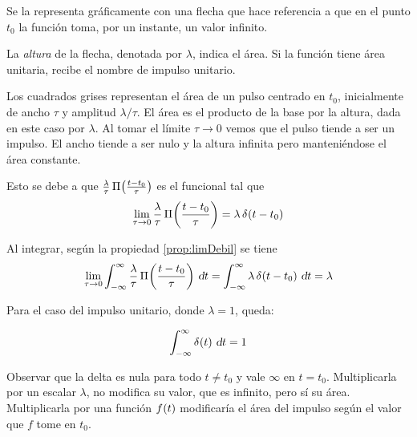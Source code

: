 Se la representa gráficamente con una flecha que hace referencia a que en el punto $t_0$ la función toma, por un instante, un valor infinito.

\begin{center}
    \def\svgwidth{0.6\linewidth}
    
\end{center}

La \emph{altura} de la flecha, denotada por $\lambda$, indica el área.
Si la función tiene área unitaria, recibe el nombre de impulso unitario.

Los cuadrados grises representan el área de un pulso centrado en $t_0$, inicialmente de ancho $\tau$ y amplitud $\lambda / \tau$.
El área es el producto de la base por la altura, dada en este caso por $\lambda$.
Al tomar el límite $\tau \to 0$ vemos que el pulso tiende a ser un impulso.
El ancho tiende a ser nulo y la altura infinita pero manteniéndose el área constante.

Esto se debe a que $\frac{\lambda}{\tau} \, \pulse[t_0]{t}{\tau}$ es el funcional tal que
\begin{equation*}
    \lim_{\tau \to 0} \frac{\lambda}{\tau} \, \pulse[t_0]{t}{\tau} = \lambda \, \fx[\delta]{t-t_0}
\end{equation*}

Al integrar, según la propiedad \ref{prop:limDebil} se tiene
\begin{equation*}
    \lim_{\tau \to 0} \int_{-\infty}^\infty \frac{\lambda}{\tau} \, \pulse[t_0]{t}{\tau} \, \dif t
    = \int_{-\infty}^\infty \lambda \, \fx[\delta]{t-t_0} \, \dif t
    = \lambda
\end{equation*}

Para el caso del impulso unitario, donde $\lambda = 1$, queda:

\begin{mdframed}[style=PropertyFrame]
    \begin{prop}
        \label{prop:integralDeImpulsoUnitario}
    \end{prop}
    \begin{equation*}
        \int_{-\infty}^\infty \fx[\delta]{t} \, \dif t = 1
    \end{equation*}
\end{mdframed}

Observar que la delta es nula para todo $t \neq t_0$ y vale $\infty$ en $t = t_0$.
Multiplicarla por un escalar $\lambda$, no modifica su valor, que es infinito, pero sí su área.
Multiplicarla por una función $\fx{t}$ modificaría el área del impulso según el valor que $f$ tome en $t_0$.

